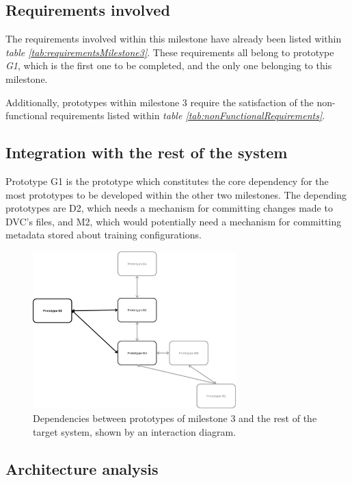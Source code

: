 \subsection{Requirements involved}

The requirements involved within this milestone have already been listed within \emph{table \ref{tab:requirementsMilestone3}}. These requirements all belong to prototype \emph{G1}, which
is the first one to be completed, and the only one belonging to this milestone.

Additionally, prototypes within milestone 3 require the satisfaction of the non-functional requirements listed within \emph{table \ref{tab:nonFunctionalRequirements}}.

\subsection{Integration with the rest of the system}

Prototype G1 is the prototype which constitutes the core dependency for the most prototypes to be developed within the other two milestones. The depending prototypes are D2, which
needs a mechanism for committing changes made to DVC's files, and M2, which would potentially need a mechanism for committing metadata stored about training configurations.

\begin{figure}[H]
    \centering
    \includegraphics[width=0.7\textwidth]{figs/G-dependencies.png}
    \caption{Dependencies between prototypes of milestone 3 and the rest of the target system, shown by an interaction diagram.}
\end{figure}

\subsection{Architecture analysis}


